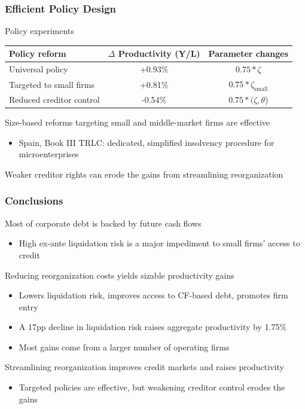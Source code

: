 \documentclass[aspectratio=169,xcolor=table]{beamer}
\begin{document}
\begin{frame}[label=Framework] \frametitle{Efficient Policy Design}

Policy experiments
\footnotesize
\begin{table}[H]
    \centering
    \renewcommand{\arraystretch}{0.9}
    \begin{tabular}{lc|c}
    \toprule
    \textbf{Policy reform} & \textbf{$\Delta$ Productivity (Y/L)} & \textbf{Parameter changes} \\
    \midrule
    Universal policy & +0.93\% & $0.75*\zeta$ \\
    Targeted to small firms & +0.81\% & $0.75*\zeta_{\text{small}}$ \\
    Reduced creditor control & -0.54\% & $ 0.75*(\zeta,\theta$) \\
    \bottomrule
    \end{tabular}
    \label{tab:percentage_changes2}
\end{table}
\normalsize


Size-based reforms targeting small and middle-market firms are effective
\begin{itemize}\small
    \item Spain, Book III TRLC: dedicated, simplified insolvency procedure for microenterprises
\end{itemize}
Weaker creditor rights can erode the gains from streamlining reorganization

\end{frame}




\begin{frame}[label=3] \frametitle{Conclusions}

Most of corporate debt is backed by future cash flows
\begin{itemize} \small
    \item High ex-ante liquidation risk is a major impediment to small firms' access to credit
\end{itemize} \normalsize \vspace{3mm}


Reducing reorganization costs yields sizable productivity gains
\begin{itemize} \small
     \item Lowers liquidation risk, improves access to CF-based debt, promotes firm entry 
     \item A 17pp decline in liquidation risk raises aggregate productivity by 1.75\%
     \item Most gains come from a larger number of operating firms
\end{itemize} \normalsize \vspace{3mm}

Streamlining reorganization improves credit markets and raises productivity
\begin{itemize} \small
     \item Targeted policies are effective, but weakening creditor control erodes the gains
\end{itemize} \normalsize

\end{frame}
\end{document}
